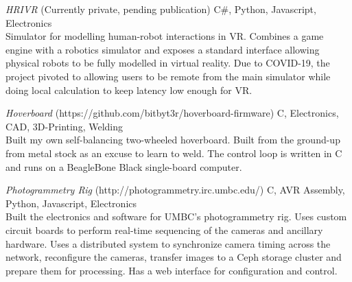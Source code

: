 \documentclass[line]{resume}
\begin{document}
\begin{resume}
    {\sl HRIVR } (Currently private, pending publication) \hfill C\#, Python, Javascript, Electronics \\
        Simulator for modelling human-robot interactions in VR. Combines a game engine with a robotics simulator and exposes a standard interface allowing physical robots to be fully modelled in virtual reality. Due to COVID-19, the project pivoted to allowing users to be remote from the main simulator while doing local calculation to keep latency low enough for VR.
        
    {\sl Hoverboard } (https://github.com/bitbyt3r/hoverboard-firmware) \hfill C, Electronics, CAD, 3D-Printing, Welding \\
        Built my own self-balancing two-wheeled hoverboard. Built from the ground-up from metal stock as an excuse to learn to weld. The control loop is written in C and runs on a BeagleBone Black single-board computer. 
        
    {\sl Photogrammetry Rig } (http://photogrammetry.irc.umbc.edu/) \hfill C, AVR Assembly, Python, Javascript, Electronics \\
        Built the electronics and software for UMBC's photogrammetry rig. Uses custom circuit boards to perform real-time sequencing of the cameras and ancillary hardware. Uses a distributed system to synchronize camera timing across the network, reconfigure the cameras, transfer images to a Ceph storage cluster and prepare them for processing. Has a web interface for configuration and control.
        
\end{resume}
\end{document}
